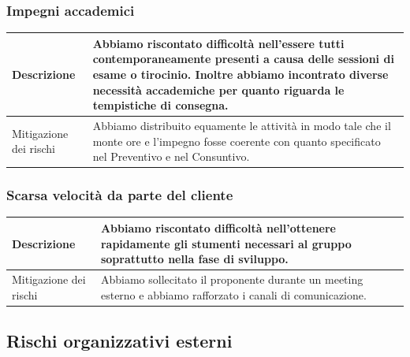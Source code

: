 \documentclass{article}
\begin{document}
\subsubsection{Impegni accademici}
\begin{center}
\begin{tabular}{|P{10em} |P{20em}|} 
\hline
     Descrizione & Abbiamo riscontato difficoltà nell'essere tutti contemporaneamente presenti a causa delle sessioni di esame o tirocinio. Inoltre abbiamo incontrato diverse necessità accademiche per quanto riguarda le tempistiche di consegna. \\
     \hline
    Mitigazione dei rischi & Abbiamo distribuito equamente le attività in modo tale che il monte ore e l'impegno fosse coerente con quanto specificato nel Preventivo e nel Consuntivo.  \\
    \hline
\end{tabular}
\label{tab:mitimpegni}
\end{center}

\subsubsection{Scarsa velocità da parte del cliente}
\begin{center}
\begin{tabular}{|P{10em}| P{20em}|}
    \hline
     Descrizione & Abbiamo riscontato difficoltà nell'ottenere rapidamente gli stumenti necessari al gruppo soprattutto nella fase di sviluppo. \\ 
     \hline
    Mitigazione dei rischi & Abbiamo sollecitato il proponente durante un meeting esterno e abbiamo rafforzato i canali di comunicazione. \\
    \hline
\end{tabular}
\label{tab:mitcliente}
\end{center}

\subsection{Rischi organizzativi esterni}
\end{document}
